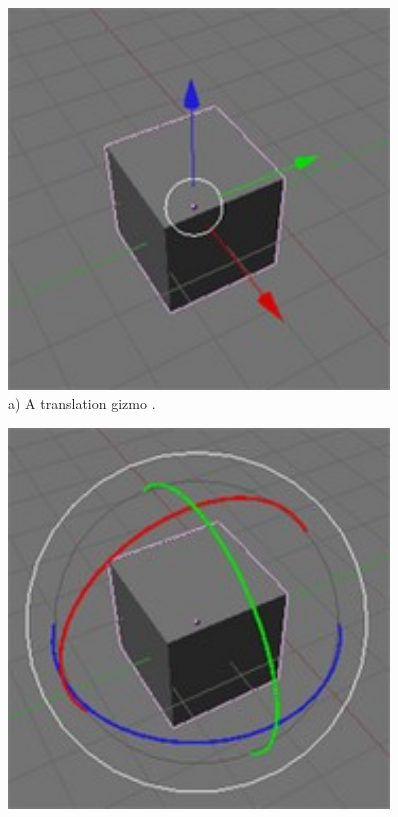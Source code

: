 \begin{figure}[htbp]
  \begin{minipage}{.5\textwidth}
    \centering
    \includegraphics[width=0.9\textwidth]{../assets/Manual-Manipulators-Translate.jpg}\\
  	a) A translation gizmo \cite{blenderwiki}.
  \end{minipage}
  \begin{minipage}{.5\textwidth}
    \centering
    \includegraphics[width=0.9\textwidth]{../assets/Manual-Manipulators-Rotate.jpg}\\

\end{minipage}
\end{figure}
